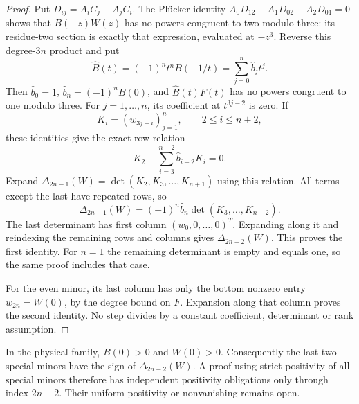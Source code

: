 \documentclass[11pt]{article}
\begin{document}
\begin{proof}
Put $D_{ij}=A_iC_j-A_jC_i$.
The Pl\"ucker identity
$A_0D_{12}-A_1D_{02}+A_2D_{01}=0$ shows that $B(-z)W(z)$
has no powers congruent to two modulo three: its residue-two section
is exactly that expression, evaluated at $-z^3$.
Reverse this degree-$3n$ product and put
\[
 \widehat B(t)=(-1)^nt^nB(-1/t)
       =\sum_{j=0}^n\widehat b_jt^j.
\]
Then $\widehat b_0=1$, $\widehat b_n=(-1)^nB(0)$, and
$\widehat B(t)F(t)$ has no powers congruent to one modulo three.
For $j=1,\ldots,n$, its coefficient at $t^{3j-2}$ is zero.
If
\[
 K_i=(w_{3j-i})_{j=1}^n,\qquad 2\le i\le n+2,
\]
these identities give the exact row relation
\[
 K_2+\sum_{i=3}^{n+2}\widehat b_{i-2}K_i=0.
\]
Expand $\Delta_{2n-1}(W)=\det(K_2,K_3,\ldots,K_{n+1})$
using this relation. All terms except the last have repeated rows,
so
\[
 \Delta_{2n-1}(W)=(-1)^n\widehat b_n
                   \det(K_3,\ldots,K_{n+2}).
\]
The last determinant has first column $(w_0,0,\ldots,0)^T$.
Expanding along it and reindexing the remaining rows and columns
gives $\Delta_{2n-2}(W)$. This proves the first identity.
For $n=1$ the remaining determinant is empty and equals one,
so the same proof includes that case.

For the even minor, its last column has only the bottom nonzero
entry $w_{2n}=W(0)$, by the degree bound on $F$.
Expansion along that column proves the second identity.
No step divides by a constant coefficient, determinant or rank
assumption.
\end{proof}

In the physical family, $B(0)>0$ and $W(0)>0$.
Consequently the last two special minors have the sign of
$\Delta_{2n-2}(W)$. A proof using strict positivity of all special
minors therefore has independent positivity obligations only through
index $2n-2$. Their uniform positivity or nonvanishing remains open.
\end{document}

